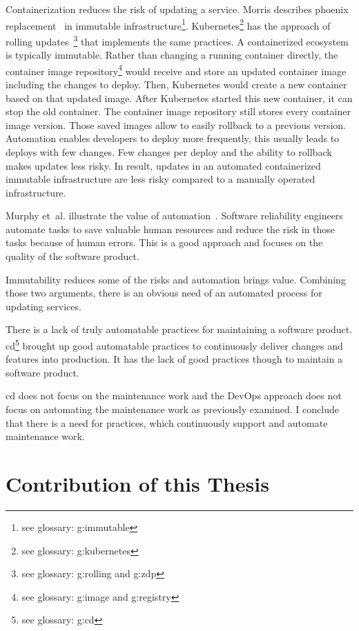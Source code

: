 Containerization reduces the risk of updating a service. Morris describes phoenix
replacement~\cite{infra_as_code_phoenix} in immutable infrastructure\footnote{see
  glossary: \gls{g:immutable}}. Kubernetes\footnote{see glossary: \gls{g:kubernetes}} has
the approach of rolling updates~\footnote{see glossary: \gls{g:rolling} and \gls{g:zdp}}
that implements the same practices. A containerized ecosystem is typically
immutable. Rather than changing a running container directly, the container image
repository\footnote{see glossary: \gls{g:image} and \gls{g:registry}} would receive and
store an updated container image including the changes to deploy. Then, Kubernetes would
create a new container based on that updated image. After Kubernetes started this new
container, it can stop the old container. The container image repository still stores
every container image version. Those saved images allow to easily rollback to a previous
version. Automation enables developers to deploy more frequently, this usually leads to
deploys with few changes. Few changes per deploy and the ability to rollback makes updates
less risky. In result, updates in an automated containerized immutable infrastructure are
less risky compared to a manually operated infrastructure.

Murphy et~al. illustrate the value of automation~\cite{sre_automation}. Software
reliability engineers automate tasks to save valuable human resources and
reduce the risk in those tasks because of human errors. This is a good approach and
focuses on the quality of the software product.

Immutability reduces some of the risks and automation brings value. Combining those two
arguments, there is an obvious need of an automated process for updating services.

There is a lack of truly automatable practices for maintaining a software
product. \gls{cd}\footnote{see glossary: \gls{g:cd}} brought up good automatable practices
to continuously deliver changes and features into production. It has the lack of good
practices though to maintain a software product.

\gls{cd} does not focus on the maintenance work and the DevOps approach does not focus on
automating the maintenance work as previously examined. I conclude that there is a need
for practices, which continuously support and automate maintenance work.

\section{Contribution of this Thesis}

